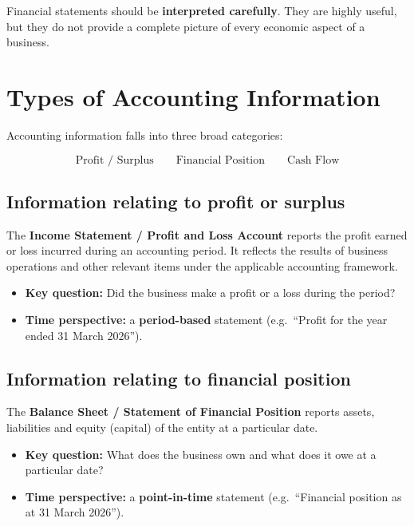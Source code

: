 \documentclass[11pt,a4paper]{article}
\begin{document}
\begin{keybox}
Financial statements should be \textbf{interpreted carefully}. They are highly useful, but they do not
provide a complete picture of every economic aspect of a business.
\end{keybox}

\section{Types of Accounting Information}

Accounting information falls into three broad categories:

\[
\boxed{\text{Profit / Surplus}}\qquad\boxed{\text{Financial Position}}\qquad\boxed{\text{Cash Flow}}
\]

\subsection{Information relating to profit or surplus}

The \textbf{Income Statement / Profit and Loss Account} reports the profit earned or loss incurred
during an accounting period. It reflects the results of business operations and other relevant
items under the applicable accounting framework.

\begin{itemize}
  \item \textbf{Key question:} Did the business make a profit or a loss during the period?
  \item \textbf{Time perspective:} a \textbf{period-based} statement (e.g.\ ``Profit for the year ended
        31 March 2026'').
\end{itemize}

\subsection{Information relating to financial position}

The \textbf{Balance Sheet / Statement of Financial Position} reports assets, liabilities and
equity (capital) of the entity at a particular date.

\begin{itemize}
  \item \textbf{Key question:} What does the business own and what does it owe at a particular date?
  \item \textbf{Time perspective:} a \textbf{point-in-time} statement (e.g.\ ``Financial position as at
        31 March 2026'').
\end{itemize}
\end{document}
